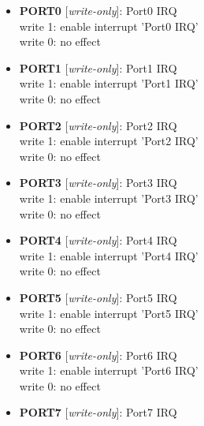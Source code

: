 \begin{itemize}
\item \begin{small}
{\bf 
PORT0
} [\emph{write-only}]: Port0 IRQ
\\
write 1: enable interrupt 'Port0 IRQ'\\write 0: no effect
\end{small}
\item \begin{small}
{\bf 
PORT1
} [\emph{write-only}]: Port1 IRQ
\\
write 1: enable interrupt 'Port1 IRQ'\\write 0: no effect
\end{small}
\item \begin{small}
{\bf 
PORT2
} [\emph{write-only}]: Port2 IRQ
\\
write 1: enable interrupt 'Port2 IRQ'\\write 0: no effect
\end{small}
\item \begin{small}
{\bf 
PORT3
} [\emph{write-only}]: Port3 IRQ
\\
write 1: enable interrupt 'Port3 IRQ'\\write 0: no effect
\end{small}
\item \begin{small}
{\bf 
PORT4
} [\emph{write-only}]: Port4 IRQ
\\
write 1: enable interrupt 'Port4 IRQ'\\write 0: no effect
\end{small}
\item \begin{small}
{\bf 
PORT5
} [\emph{write-only}]: Port5 IRQ
\\
write 1: enable interrupt 'Port5 IRQ'\\write 0: no effect
\end{small}
\item \begin{small}
{\bf 
PORT6
} [\emph{write-only}]: Port6 IRQ
\\
write 1: enable interrupt 'Port6 IRQ'\\write 0: no effect
\end{small}
\item \begin{small}
{\bf 
PORT7
} [\emph{write-only}]: Port7 IRQ
\\

\end{small}
\end{itemize}
